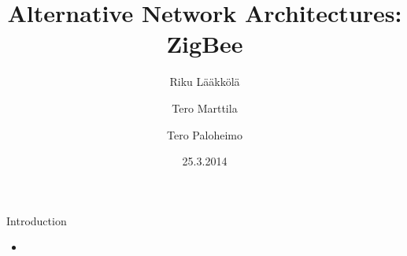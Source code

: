 \documentclass{beamer}
\title[ZigBee]{Alternative Network Architectures: ZigBee}
\author{Riku Lääkkölä \and Tero Marttila \and Tero Paloheimo}
\institute{Aalto ELEC}
\date{25.3.2014}
\begin{document}
\begin{frame}
  	\titlepage
\end{frame}


\begin{frame}{Introduction}
	\begin{itemize}
    \item 
 	\end{itemize}
\end{frame}
\end{document}
